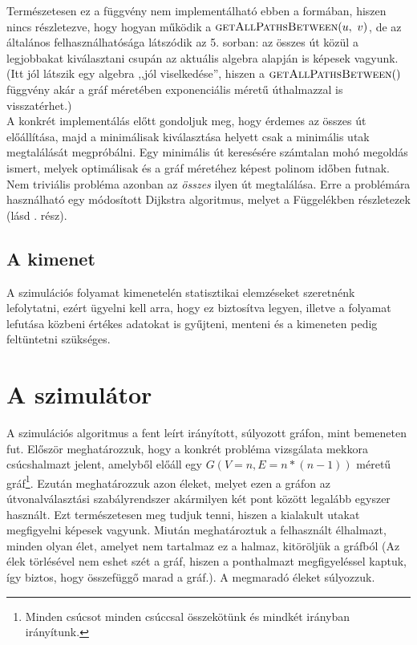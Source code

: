       Természetesen ez a függvény nem implementálható ebben a formában, hiszen nincs részletezve, hogy hogyan működik a $\Call{getAllPathsBetween}{u,~v}$, de az általános felhasználhatósága látszódik az 5. sorban: az összes út közül a legjobbakat kiválasztani csupán az aktuális algebra alapján is képesek vagyunk. (Itt jól látszik egy algebra ,,jól viselkedése'', hiszen a $\Call{getAllPathsBetween}$ függvény akár a gráf méretében exponenciális méretű úthalmazzal is visszatérhet.)\\

      A konkrét implementálás előtt gondoljuk meg, hogy érdemes az összes út előállítása, majd a minimálisak kiválasztása helyett csak a minimális utak megtalálását megpróbálni. Egy minimális út keresésére számtalan mohó megoldás ismert, melyek optimálisak és a gráf méretéhez képest polinom időben futnak. Nem triviális probléma azonban az \textit{összes} ilyen út megtalálása. Erre a problémára használható egy módosított Dijkstra algoritmus, melyet a Függelékben részletezek (lásd . rész).

    \subsection{A kimenet}
    A szimulációs folyamat kimenetelén statisztikai elemzéseket szeretnénk lefolytatni, ezért ügyelni kell arra, hogy ez biztosítva legyen, illetve a folyamat lefutása közbeni értékes adatokat is gyűjteni, menteni és a kimeneten pedig feltüntetni szükséges.

  \section{A szimulátor}\label{section_simulator}
  A szimulációs algoritmus a fent leírt irányított, súlyozott gráfon, mint bemeneten fut. Először meghatározzuk, hogy a konkrét probléma vizsgálata mekkora csúcshalmazt jelent, amelyből előáll egy $G(V=n, E=n*(n-1))$ méretű gráf\footnote{Minden csúcsot minden csúccsal összekötünk és mindkét irányban irányítunk.}. Ezután meghatározzuk azon éleket, melyet ezen a gráfon az útvonalválasztási szabályrendszer akármilyen két pont között legalább egyszer használt. Ezt természetesen meg tudjuk tenni, hiszen a kialakult utakat megfigyelni képesek vagyunk. Miután meghatároztuk a felhasznált élhalmazt, minden olyan élet, amelyet nem tartalmaz ez a halmaz, kitöröljük a gráfból (Az élek törlésével nem eshet szét a gráf, hiszen a ponthalmazt megfigyeléssel kaptuk, így biztos, hogy összefüggő marad a gráf.). A megmaradó éleket súlyozzuk.\\

